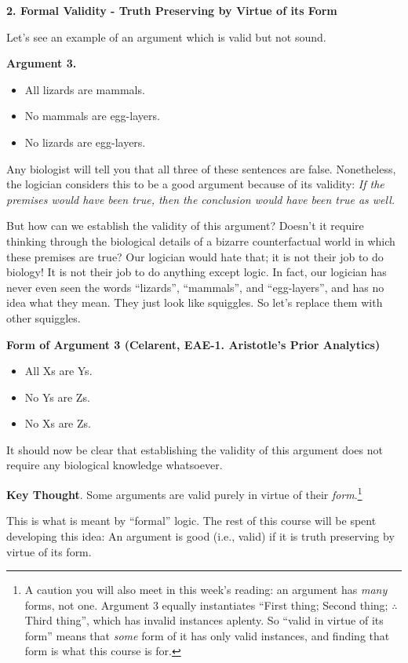 \documentclass[options]{philosophersimprint}
\theoremstyle{definition}
\begin{document}
\textbf{2. Formal Validity - Truth Preserving by Virtue of its Form}

Let's see an example of an argument which is valid but not sound.

\textbf{Argument 3.}
\begin{itemize}
    \item[] All lizards are mammals.
    \item[] No mammals are egg-layers.
    \item[$\therefore$] No lizards are egg-layers.
\end{itemize}
Any biologist will tell you that all three of these sentences are false. Nonetheless, the logician considers this to be a good argument because of its validity: \textit{If the premises would have been true, then the conclusion would have been true as well.}

But how can we establish the validity of this argument? Doesn't it require thinking through the biological details of a bizarre counterfactual world in which these premises are true? Our logician would hate that; it is not their job to do biology! It is not their job to do anything except logic. In fact, our logician has never even seen the words ``lizards'', ``mammals'', and ``egg-layers'', and has no idea what they mean. They just look like squiggles. So let's replace them with other squiggles.

\textbf{Form of Argument 3 (Celarent, EAE-1. Aristotle's Prior Analytics)}
\begin{itemize}
    \item[] All Xs are Ys.
    \item[] No Ys are Zs.
    \item[$\therefore$] No Xs are Zs.
\end{itemize}
It should now be clear that establishing the validity of this argument does not require any biological knowledge whatsoever.

\textbf{Key Thought}. Some arguments are valid purely in virtue of their \textit{form}.\footnote{A caution you will also meet in this week's reading: an argument has \textit{many} forms, not one. Argument 3 equally instantiates ``First thing; Second thing; $\therefore$ Third thing'', which has invalid instances aplenty. So ``valid in virtue of its form'' means that \textit{some} form of it has only valid instances, and finding that form is what this course is for.}

This is what is meant by ``formal'' logic. The rest of this course will be spent developing this idea: An argument is good (i.e., valid) if it is truth preserving by virtue of its form.
\end{document}

